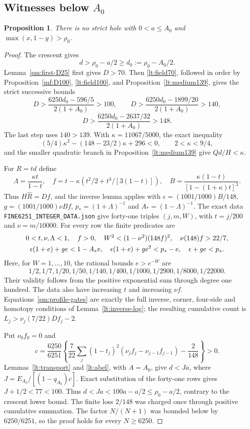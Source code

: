 \documentclass[11pt,reqno]{amsart}
\numberwithin{equation}{section}
\newtheorem{proposition}[theorem]{Proposition}
\theoremstyle{definition}
\theoremstyle{remark}
\DeclareRobustCommand{\cert}[1]{\nolinkurl{#1}}
\begin{document}
\subsection{Witnesses below $A_0$}

\begin{proposition}\label{sm:fine}
There is no strict hole with $0<a\le A_0$ and
$\max(x,1-y)>\rho_0$.
\end{proposition}
\begin{proof}
The crescent gives
\[
 d>\rho_0-a/2\ge d_0:=\rho_0-A_0/2.
\]
Lemma~\ref{sm:first-D25} first gives $D>70$.
Then \eqref{lt:field70}, followed in order by
Proposition~\ref{mf:D100}, \eqref{lt:field100}, and
Proposition~\ref{lt:medium139}, gives the strict successive bounds
\[
 D>\frac{6250d_0-596/5}{2(1+A_0)}>100,\qquad
 D>\frac{6250d_0-1899/20}{2(1+A_0)}>140,
\]
\[
 D>\frac{6250d_0-2637/32}{2(1+A_0)}>148.
\]
The last step uses $140>139$.
With $\kappa=11067/5000$, the exact inequality
\[
 (5/4)\kappa^2-(148-23/2)\kappa+296<0,\qquad 2<\kappa<9/4,
\]
and the smaller quadratic branch in Proposition~\ref{lt:medium139}
give $Qd/H<\kappa$.

For $R=td$ define
\[
 \Lambda=\frac{\kappa t}{1-t},\quad
 f=t-\kappa\left(t^2/2+t^3/[3(1-t)]\right),\quad
 B=\frac{\kappa(1-t)}{[1-(1+\kappa)t]^3}.
\]
Thus $H\widehat R=Df$, and the inverse lemma applies with
$\epsilon=(1001/1000)B/148$,
$g=(1001/1000)\nu Bf$, $p_*=(1+\Lambda)^{-1}$ and
$A_*=(1-\Lambda)^{-1}$.
The exact data \cert{FINE6251_INTEGER_DATA.json} give forty-one
triples $(j,m,W)$, with $t=j/200$ and $\nu=m/10000$.
For every row the finite predicates are
\begin{gather}
 0<t,\nu,\Lambda<1,\quad f>0,\quad
 W^2<(1-\nu^2)(148f)^2,\quad\nu(148)f>22/7,\notag\\
 \epsilon(1+e)+ge<1-A_*e,\quad
 \epsilon(1+e)+ge^2<p_*-e,\quad\epsilon+ge<p_*.
 \label{sm:profile-gates}
\end{gather}
Here, for $W=1,\ldots,10$, the rational bounds $e>e^{-W}$ are
\[
 1/2, 1/7, 1/20, 1/50, 1/140, 1/400,
 1/1000, 1/2900, 1/8000, 1/22000.
\]
Their validity follows from the positive exponential sum through
degree one hundred. The data also have increasing $t$ and increasing
$\nu f$. Equations~\eqref{sm:profile-gates} are exactly the full
inverse, corner, four-side and homotopy conditions of
Lemma~\ref{lt:inverse-log}; the resulting cumulative count is
$L_j>\nu_j(7/22)Df_j-2$.

Put $\nu_0f_0=0$ and
\[
 c=\frac{6250}{6251}\left\{
 \frac7{22}\sum_j(1-t_j)^2(\nu_jf_j-\nu_{j-1}f_{j-1})-\frac2{148}
 \right\}>0.
\]
Lemmas~\ref{lt:transport} and \ref{lt:abel}, with $A=A_0$, give
$d<Ja$, where $J=E_{A_0}/[(1-q_{A_0})c]$.
Exact substitution of the forty-one rows gives
$J+1/2<77<100$.
Thus $d<Ja<100a-a/2\le\rho_0-a/2$, contrary to the crescent
lower bound. The finite loss $2/148$ was charged once through
positive cumulative summation. The factor $N/(N+1)$ was bounded
below by $6250/6251$, so the proof holds for every $N\ge6250$.
\end{proof}
\end{document}
